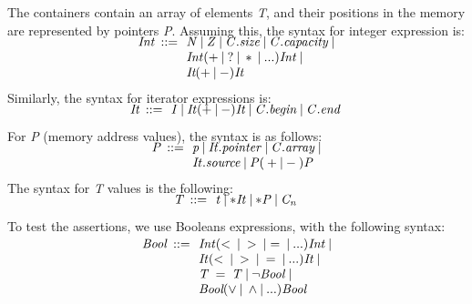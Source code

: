 \documentclass[a4paper]{llncs}
\begin{document}
	
	The containers contain an array of elements \emph{T}, and their positions in the memory are represented by pointers \emph{P}.
Assuming this, the syntax for integer expression is:
%
\[\begin{array}{r@{\:\:}c@{\:\:}l}
\\[-5ex]
\mathit{Int}  & ::= & \: \mathit{N} \: | \: \mathit{Z} \: | \: \mathit{C.size} \: | \: \mathit{C.capacity} \: | \\
              &     & \: \mathit{Int} ( + \: | \: ? \: | \: * \: | \: ...) \mathit{Int}  \: | \\
              &     & \: \textit{It} ( + \: | \: - ) \textit{It} 
\end{array}
\]
%
Similarly, the syntax for iterator expressions is:
%
%
\[\begin{array}{r@{\:\:}c@{\:\:}l}\label{iterator-semantics}
\\[-5ex]
\mathit{It}   & ::= & \: \mathit{I} \: | \: \mathit{It} ( + \: | \: - ) \mathit{It} \: | \: \mathit{C.begin} \: | \: \mathit{C.end} \:  \\
\end{array}
\]
%
%
For \emph{P} (memory address values), the syntax is as follows:
%	
\[\begin{array}{r@{\:\:}c@{\:\:}l}\label{pointer-semantics}
\\[-5ex]
\mathit{P}  & ::= & \: \mathit{p} \: | \: \mathit{It.pointer} \: | \: \mathit{C.array} \: | \\
            &     & \: \mathit{It.source} \: | \: \mathit{P}  ( \: + \: | \: - \: )  \textit{P} \: \\
\end{array}
\]
%	
The syntax for \emph{T} values is the following: 
%
\[\begin{array}{r@{\:\:}c@{\:\:}l}\label{element-semantics}
\\[-5ex]
\mathit{T}   & ::= & \: \mathit{t} \: | \: \mathit{*It} \: | \: \mathit{*P} \: | \: \mathit{C_n} \:  \\
\end{array}
\]
%
To test the assertions, we use Booleans expressions, with the following syntax: 
%

\[\begin{array}{r@{\:\:}c@{\:\:}l}\label{boolean-semantics}
\\[-5ex]
\mathit{Bool}  & ::= & \: \mathit{Int} ( < \: | \: > \: | = \: | \: ... ) \mathit{Int} \: | \\
               &     & \: \mathit{It} ( < \: | \:> \: | \: = \: | \: ... ) \mathit{It}  \: | \\
               &     & \: \mathit{T} \: = \: \mathit{T} \: | \: \neg\mathit{Bool} \: | \\
               &     & \: \textit{Bool} ( \vee \: | \: \wedge | \: ... ) \textit{Bool} \: \\
               
\end{array}
\]
\end{document}
